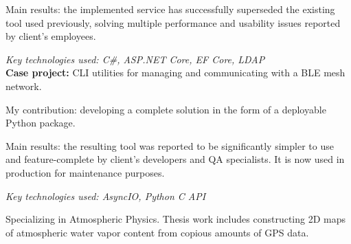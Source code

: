 \documentclass[
	a4paper,
]{fortysecondscv}
\begin{document}
Main results: the implemented service has successfully superseded the existing tool used previously, solving multiple performance and usability issues reported by client's employees.

\textit{Key technologies used: C\#, ASP.NET Core, EF Core, LDAP}
\\[0.5em]
\textbf{Case project:} CLI utilities for managing and communicating with a BLE mesh network.

My contribution: developing a complete solution in the form of a deployable Python package.

Main results: the resulting tool was reported to be significantly simpler to use and feature-complete by client's developers and QA specialists. It is now used in production for maintenance purposes.

\textit{Key technologies used: AsyncIO, Python C API}

\begin{cvtable}[1.5]
		{Specializing in Atmospheric Physics. Thesis work includes constructing 2D maps of atmospheric water vapor content from copious amounts of GPS data.}
\end{cvtable}


\begin{cvtable}
\end{cvtable}


\end{document}

